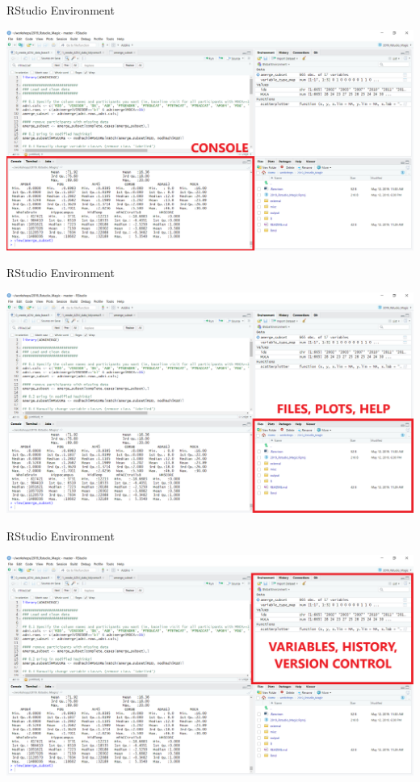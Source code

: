 \documentclass[
  ignorenonframetext,
]{beamer}
\begin{document}
\begin{frame}{RStudio Environment}
\protect\hypertarget{rstudio-environment-1}{}

\includegraphics{../external/images/rstudio_terminal_1_CONSOLE.png}

\end{frame}

\begin{frame}{RStudio Environment}
\protect\hypertarget{rstudio-environment-2}{}

\includegraphics{../external/images/rstudio_terminal_2_FILES.png}

\end{frame}

\begin{frame}{RStudio Environment}
\protect\hypertarget{rstudio-environment-3}{}

\includegraphics{../external/images/rstudio_terminal_3_ENV.png}

\end{frame}
\end{document}

